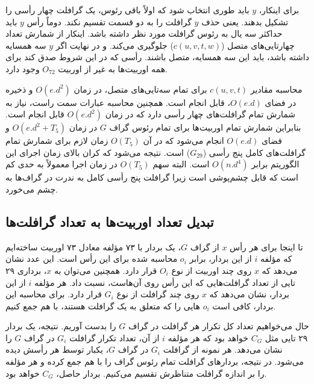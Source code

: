 برای اینکار، $y$ باید طوری انتخاب شود که اولاً  باقی رئوس، یک گرافلت چهار رأسی را تشکیل بدهند. یعنی حذف $y$ گرافلت را به دو قسمت تقسیم نکند. دوماً رأس $y$ باید حداکثر سه یال به رئوس گرافلت مورد نظر داشته باشد. اینکار از شمارش تعداد چهارتایی‌های متصل ($c(u,v,t,w)$) جلوگیری می‌کند. و در نهایت اگر $y$ سه همسایه داشته باشد، باید این سه همسایه، متصل باشند. رأسی که در این شروط صدق کند برای همه اوربیت‌ها به غیر از اوربیت $O_{72}$ وجود دارد.

محاسبه مقادیر $c(u,v,t)$‌ برای تمام سه‌تایی‌های متصل، در زمان $O(e.d^2)$ و ذخیره در فضای $O(e.d)$، قابل انجام است. همچنین محاسبه عبارات سمت راست، نیاز به شمارش تمام گرافلت‌های چهار رأسی دارد که در زمان $O(e.d^2)$ قابل انجام است. بنابراین شمارش تمام اوربیت‌ها برای تمام رئوس گراف $G$ در زمان $O(e.d^2 + T_5)$ و فضای $O(e.d)$ انجام می‌شود که در آن $O(T_5)$ زمان لازم برای شمارش تمام گرافلت‌های کامل پنج رأسی ($G_{29}$) است. نتیجه می‌شود که کران بالای زمان اجرای این الگوریتم برابر $O(n.d^4)$ است. البته سهم $O(T_5)$ در زمان اجرا معمولاً به حدی کم است که قابل چشم‌پوشی است زیرا گرافلت پنج رأسی کامل به ندرت در گراف‌ها به چشم می‌خورد.

\subsection{تبدیل تعداد اوربیت‌ها به تعداد گرافلت‌ها}
تا اینجا برای هر رأس $x$ از گراف $G$، یک بردار با ۷۳ مؤلفه معادل ۷۳ اوربیت ساخته‌ایم که مؤلفه $i$ از این بردار، برابر $o_i$ محاسبه شده برای این رأس است. این عدد نشان می‌دهد که $x$ روی چند اوربیت از نوع $O_i$ قرار دارد. همچنین می‌توان به $x$، برداری ۲۹ تایی از تعداد گرافلت‌هایی که این رأس روی آن‌هاست، نسبت داد. هر مؤلفه $i$ از این بردار، نشان می‌دهد که $x$ روی چند گرافلت از نوع $G_i$ قرار دارد. برای محاسبه این بردار، کافی است $o_i$ هایی را که متعلق به یک گرافلت هستند، با هم جمع کنیم.

حال می‌خواهیم تعداد کل تکرار هر گرافلت‌ در گراف $G$ را بدست آوریم. نتیجه، یک بردار ۲۹ تایی مثل $C_G$ خواهد بود که هر مؤلفه $i$ از آن، تعداد تکرار گرافلت $G_i$ در گراف $G$ را نشان می‌دهد. هر نمونه از گرافلت $G_i$ در گراف $G$، یکبار توسط هر رأسش دیده می‌شود. در نتیجه، بردارهای گرافلت تمام رئوس گراف را با هم جمع کرده و هر مؤلفه را بر اندازه گرافلت متناظرش تقسیم می‌کنیم. بردار حاصل، $C_G$ خواهد بود.

